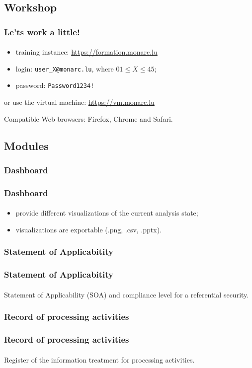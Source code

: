 \subsection{Workshop}
\begin{frame}
  \frametitle{Le'ts work a little!}
  \framesubtitle{}
  \begin{itemize}
    \item training instance: \url{https://formation.monarc.lu}
    \item login: \texttt{user\_X@monarc.lu}, where $01 \leq X \leq 45$;
    \item password: \texttt{Password1234!}
  \end{itemize}

  \bigskip

  or use the virtual machine: \url{https://vm.monarc.lu}

  \bigskip
  Compatible Web browsers: Firefox, Chrome and Safari.
\end{frame}



\subsection{Modules}
\subsubsection{Dashboard}
\begin{frame}
  \frametitle{Dashboard}
  \framesubtitle{}
  \begin{itemize}
    \item provide different visualizations of the current analysis state;
    \item visualizations are exportable (.png, .csv, .pptx).
  \end{itemize}
\end{frame}

\subsubsection{Statement of Applicabitity}
\begin{frame}
  \frametitle{Statement of Applicabitity}
  \framesubtitle{}
  Statement of Applicability (SOA) and compliance level for a referential security.
\end{frame}

\subsubsection{Record of processing activities}
\begin{frame}
  \frametitle{Record of processing activities}
  \framesubtitle{}
  Register of the information treatment for processing activities.
\end{frame}



